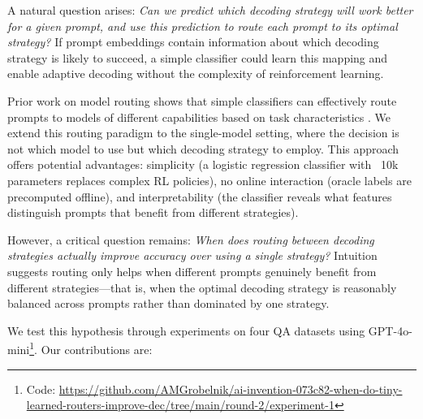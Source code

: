 \documentclass[11pt,letterpaper]{article}
\begin{document}
A natural question arises: \textit{Can we predict which decoding strategy will work better for a given prompt, and use this prediction to route each prompt to its optimal strategy?} If prompt embeddings contain information about which decoding strategy is likely to succeed, a simple classifier could learn this mapping and enable adaptive decoding without the complexity of reinforcement learning.

Prior work on model routing shows that simple classifiers can effectively route prompts to models of different capabilities based on task characteristics \cite{Ong2024, Hu2024}. We extend this routing paradigm to the single-model setting, where the decision is not which model to use but which decoding strategy to employ. This approach offers potential advantages: simplicity (a logistic regression classifier with ~10k parameters replaces complex RL policies), no online interaction (oracle labels are precomputed offline), and interpretability (the classifier reveals what features distinguish prompts that benefit from different strategies).

However, a critical question remains: \textit{When does routing between decoding strategies actually improve accuracy over using a single strategy?} Intuition suggests routing only helps when different prompts genuinely benefit from different strategies---that is, when the optimal decoding strategy is reasonably balanced across prompts rather than dominated by one strategy.

We test this hypothesis through experiments on four QA datasets using GPT-4o-mini\footnote{Code: \url{https://github.com/AMGrobelnik/ai-invention-073c82-when-do-tiny-learned-routers-improve-dec/tree/main/round-2/experiment-1}}. Our contributions are:
\end{document}
